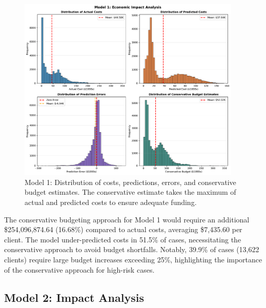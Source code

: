 \begin{figure}[htbp]
\centering
\includegraphics[width=0.95\textwidth]{figures/model_1_Impact_Histograms.pdf}
\caption{Model 1: Distribution of costs, predictions, errors, and conservative budget estimates. The conservative estimate takes the maximum of actual and predicted costs to ensure adequate funding.}
\label{fig:model1_impact_histograms}
\end{figure}

The conservative budgeting approach for Model 1 would require an additional \$254,096,874.64 (16.68\%) compared to actual costs, averaging \$7,435.60 per client. The model under-predicted costs in 51.5\% of cases, necessitating the conservative approach to avoid budget shortfalls. Notably, 39.9\% of cases (13,622 clients) require large budget increases exceeding 25\%, highlighting the importance of the conservative approach for high-risk cases. 

\clearpage

\subsection{Model 2: Impact Analysis}
\label{subsec:model2_impact}

